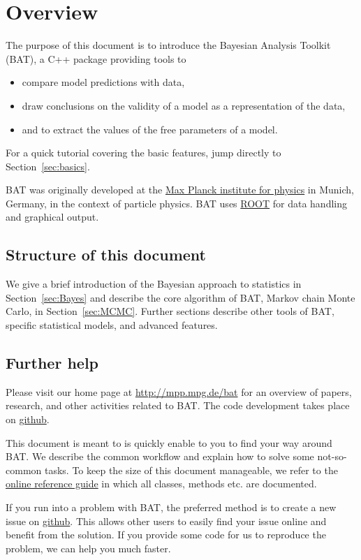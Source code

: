 \documentclass[
10pt,
a4paper,
bibliography=totoc,
captions=nooneline, %
numbers=noenddot,
twoside]{scrbook}
\newcommand{\BAT}{{\scshape BAT}\xspace}
\newcommand{\ROOT}{{\scshape ROOT}\xspace}
\newcommand{\BATurl}{http://mpp.mpg.de/bat}
\newcommand{\BATgithub}{https://github.com/bat/bat}
\newcommand{\ROOTurl}{https://root.cern.ch/}
\def \refsec#1{Section~\ref{sec:#1}}
\begin{document}
\section*{Overview}

The purpose of this document is to introduce the Bayesian Analysis
Toolkit (\BAT), a C++ package providing tools to
\begin{itemize}
  \item compare model predictions with data,
  \item draw conclusions on the validity of a model as a representation of the data,
  \item and to extract the values of the free parameters of a model.
\end{itemize}
For a quick tutorial covering the basic features, jump directly to
\refsec{basics}.

\BAT was originally developed at the \href{http://mpp.mpg.de}{Max
  Planck institute for physics} in Munich, Germany, in the context of
particle physics. \BAT uses \href{\ROOTurl}{\ROOT} for data handling and graphical
output.

\subsection*{Structure of this document}

We give a brief introduction of the Bayesian approach to statistics in
\refsec{Bayes} and describe the core algorithm of \BAT, Markov chain
Monte Carlo, in \refsec{MCMC}. Further sections describe other tools
of \BAT, specific statistical models, and advanced features.

\subsection*{Further help}

Please visit our home page at \url{\BATurl} for an overview of papers,
research, and other activities related to \BAT. The code development
takes place on \href{\BATgithub}{github}.

This document is meant to is quickly enable to you to find your way
around \BAT. We describe the common workflow and explain how to solve
some not-so-common tasks. To keep the size of this document
manageable, we refer to the \href{\BATurl/docs/refman/latest/}{online
  reference guide} in which all classes, methods etc. are documented.

If you run into a problem with \BAT, the preferred method is to create
a new issue on \href{\BATgithub/issues}{github}. This allows other
users to easily find your issue online and benefit from the
solution. If you provide some code for us to reproduce the problem, we
can help you much faster.
\end{document}
